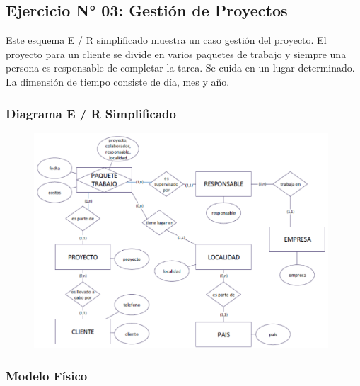 \documentclass[12pt,letterpaper]{article}
\begin{document}
\newpage


\subsection{Ejercicio N° 03: Gestión de Proyectos}

Este esquema E / R simplificado muestra un caso gestión del proyecto. El proyecto para un cliente se divide en varios paquetes de trabajo y siempre una persona es responsable de completar la tarea. Se cuida en un lugar determinado. La dimensión de tiempo consiste de día, mes y año.

\subsubsection{\textbf{Diagrama E / R Simplificado}}

	\begin{figure}[htb]
		\begin{center}
			\includegraphics[width=11cm]{./IMAGENES/Ejercicio_3}
			
		\end{center}
	\end{figure}

\subsubsection{\textbf{Modelo Físico }}
\end{document}
